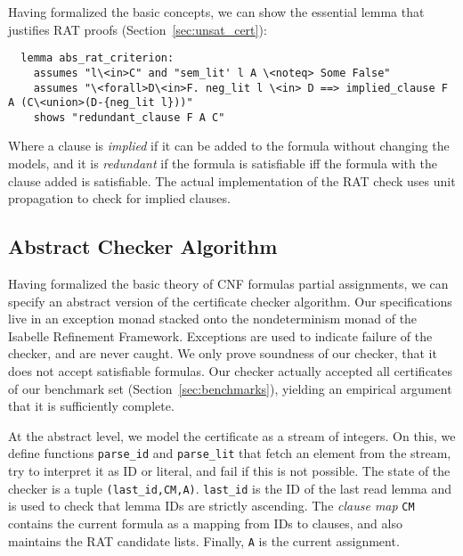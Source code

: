 \documentclass{llncs}
\newcommand{\isai}{\lstinline[language=isabelle,basicstyle=\normalsize\ttfamily\slshape]}
\begin{document}
Having formalized the basic concepts, we can show the essential lemma that justifies RAT proofs (\cf Section~\ref{sec:unsat_cert}):
\begin{lstlisting}
  lemma abs_rat_criterion:
    assumes "l\<in>C" and "sem_lit' l A \<noteq> Some False"
    assumes "\<forall>D\<in>F. neg_lit l \<in> D ==> implied_clause F A (C\<union>(D-{neg_lit l}))"  
    shows "redundant_clause F A C"
\end{lstlisting}
Where a clause is \emph{implied} if it can be added to the formula without changing the models, 
and it is \emph{redundant} if the formula is satisfiable iff the formula with the clause added is satisfiable.
The actual implementation of the RAT check uses unit propagation to check for implied clauses.
% 
% 
% 

\subsection{Abstract Checker Algorithm}
Having formalized the basic theory of CNF formulas \wrt partial assignments, we can specify an abstract version of the certificate checker algorithm.
Our specifications live in an exception monad stacked onto the nondeterminism monad of the Isabelle Refinement Framework.
Exceptions are used to indicate failure of the checker, and are never caught.
%
We only prove soundness of our checker, \ie that it does not accept satisfiable formulas.
Our checker actually accepted all certificates of our benchmark set (\cf Section~\ref{sec:benchmarks}), yielding 
an empirical argument that it is sufficiently complete.

At the abstract level, we model the certificate as a stream of integers. On this, we define functions \isai$parse_id$ and \isai$parse_lit$ that fetch an 
element from the stream, try to interpret it as ID or literal, and fail if this is not possible.
The state of the checker is a tuple \isai$(last_id,CM,A)$. \isai{last_id} is the ID of the last read lemma and is used to check that lemma IDs are strictly ascending.
The \emph{clause map} \isai{CM} contains the current formula as a mapping from IDs to clauses, and also maintains the RAT candidate lists. Finally, \isai$A$ is the current assignment.
\end{document}
